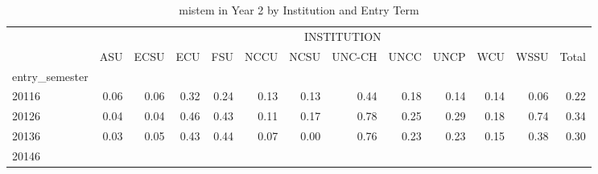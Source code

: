 \begin{table}[!h]
\caption{mistem in Year 2 by Institution and Entry Term}
\centering
\begin{tabular}{lllllllllllll}
\cline{1-13}
\multicolumn{1}{c}{} &
  \multicolumn{12}{|c}{INSTITUTION} \\
\multicolumn{1}{c}{} &
  \multicolumn{1}{|r}{ASU} &
  \multicolumn{1}{r}{ECSU} &
  \multicolumn{1}{r}{ECU} &
  \multicolumn{1}{r}{FSU} &
  \multicolumn{1}{r}{NCCU} &
  \multicolumn{1}{r}{NCSU} &
  \multicolumn{1}{r}{UNC-CH} &
  \multicolumn{1}{r}{UNCC} &
  \multicolumn{1}{r}{UNCP} &
  \multicolumn{1}{r}{WCU} &
  \multicolumn{1}{r}{WSSU} &
  \multicolumn{1}{r}{Total} \\
\cline{1-13}
\multicolumn{1}{l}{entry\_semester} &
  \multicolumn{1}{|r}{} &
  \multicolumn{1}{r}{} &
  \multicolumn{1}{r}{} &
  \multicolumn{1}{r}{} &
  \multicolumn{1}{r}{} &
  \multicolumn{1}{r}{} &
  \multicolumn{1}{r}{} &
  \multicolumn{1}{r}{} &
  \multicolumn{1}{r}{} &
  \multicolumn{1}{r}{} &
  \multicolumn{1}{r}{} &
  \multicolumn{1}{r}{} \\
\multicolumn{1}{l}{\hspace{1em}20116} &
  \multicolumn{1}{|r}{0.06} &
  \multicolumn{1}{r}{0.06} &
  \multicolumn{1}{r}{0.32} &
  \multicolumn{1}{r}{0.24} &
  \multicolumn{1}{r}{0.13} &
  \multicolumn{1}{r}{0.13} &
  \multicolumn{1}{r}{0.44} &
  \multicolumn{1}{r}{0.18} &
  \multicolumn{1}{r}{0.14} &
  \multicolumn{1}{r}{0.14} &
  \multicolumn{1}{r}{0.06} &
  \multicolumn{1}{r}{0.22} \\
\multicolumn{1}{l}{\hspace{1em}20126} &
  \multicolumn{1}{|r}{0.04} &
  \multicolumn{1}{r}{0.04} &
  \multicolumn{1}{r}{0.46} &
  \multicolumn{1}{r}{0.43} &
  \multicolumn{1}{r}{0.11} &
  \multicolumn{1}{r}{0.17} &
  \multicolumn{1}{r}{0.78} &
  \multicolumn{1}{r}{0.25} &
  \multicolumn{1}{r}{0.29} &
  \multicolumn{1}{r}{0.18} &
  \multicolumn{1}{r}{0.74} &
  \multicolumn{1}{r}{0.34} \\
\multicolumn{1}{l}{\hspace{1em}20136} &
  \multicolumn{1}{|r}{0.03} &
  \multicolumn{1}{r}{0.05} &
  \multicolumn{1}{r}{0.43} &
  \multicolumn{1}{r}{0.44} &
  \multicolumn{1}{r}{0.07} &
  \multicolumn{1}{r}{0.00} &
  \multicolumn{1}{r}{0.76} &
  \multicolumn{1}{r}{0.23} &
  \multicolumn{1}{r}{0.23} &
  \multicolumn{1}{r}{0.15} &
  \multicolumn{1}{r}{0.38} &
  \multicolumn{1}{r}{0.30} \\
\multicolumn{1}{l}{\hspace{1em}20146} &

\end{tabular}
\end{table}
